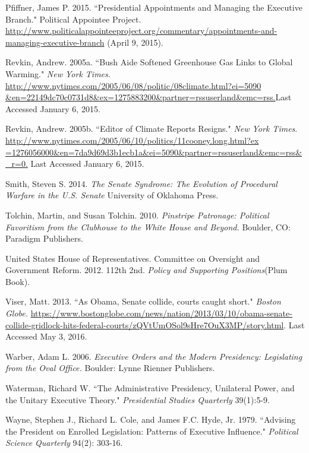 \documentclass[12pt]{article}
\begin{document}
\noindent \hangindent=0.7cm Pfiffner, James P. 2015. ``Presidential Appointments and Managing the Executive Branch." Political Appointee Project. \url{http://www.politicalappointeeproject.org/commentary/appointments-and-managing-executive-branch} (April 9, 2015).

\noindent \hangindent=0.7cm Revkin, Andrew. 2005a. ``Bush Aide Softened Greenhouse Gas Links to Global Warming." \textit{New York Times}. \url{http://www.nytimes.com/2005/06/08/politic/08climate.html?ei=5090 &en=22149dc70c0731d8&ex=1275883200&partner=rssuserland&emc=rss.}Last Accessed January 6, 2015.

\noindent \hangindent=0.7cm Revkin, Andrew. 2005b. ``Editor of Climate Reports Resigns." \textit{New York Times}. \url{http://www.nytimes.com/2005/06/10/politics/11cooney.long.html?ex =1276056000&en=7da9d69d3b1ecb1a&ei=5090&partner=rssuserland&emc=rss&_r=0.} Last Accessed January 6, 2015. 

\noindent \hangindent=0.7cm Smith, Steven S. 2014. \textit{The Senate Syndrome: The Evolution of Procedural Warfare in the U.S. Senate} University of Oklahoma Press.

\noindent \hangindent=0.7cm Tolchin, Martin, and Susan Tolchin. 2010. \textit{Pinstripe Patronage: Political Favoritism from the Clubhouse to the White House and Beyond.} Boulder, CO: Paradigm Publishers.

\noindent \hangindent=0.7cm United States House of Representatives. Committee on Oversight and Government Reform. 2012. 112th 2nd. \textit{Policy and Supporting Positions}(Plum Book). 

\noindent \hangindent=0.7cm Viser, Matt. 2013. ``As Obama, Senate collide, courts caught short." \textit{Boston Globe.} \url{https://www.bostonglobe.com/news/nation/2013/03/10/obama-senate-collide-gridlock-hits-federal-courts/zQVtUmOSol9sHre7OuX3MP/story.html}. Last Accessed May 3, 2016.

\noindent \hangindent=0.7cm Warber, Adam L. 2006. \textit{Executive Orders and the Modern Presidency: Legislating from the Oval Office.} Boulder: Lynne Rienner Publishers. 

\noindent \hangindent=0.7cm Waterman, Richard W. ``The Administrative Presidency, Unilateral Power, and the Unitary Executive Theory." \textit{Presidential Studies Quarterly} 39(1):5-9.

\noindent \hangindent=0.7cm Wayne, Stephen J., Richard L. Cole, and James F.C. Hyde, Jr. 1979. ``Advising the President on Enrolled Legislation: Patterns of Executive Influence." \textit{Political Science Quarterly} 94(2): 303-16. 
\end{document}
